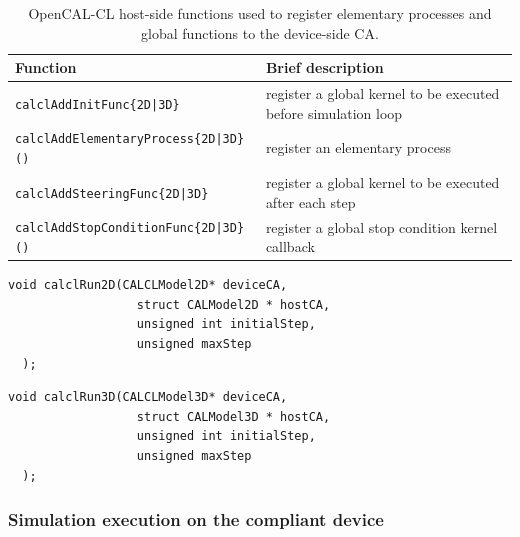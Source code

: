 \begin{table}
  \centering
  \begin{footnotesize}
  \begin{tabular}{l|l}
    \hline
    Function & Brief description\\
    \hline
    \verb'calclAddInitFunc{2D|3D}'             & register a global kernel to be executed before simulation loop \\
    \verb'calclAddElementaryProcess{2D|3D}()'  & register an elementary process \\
    \verb'calclAddSteeringFunc{2D|3D}'         & register a global kernel to be executed after each step \\
    \verb'calclAddStopConditionFunc{2D|3D}()'  & register a global stop condition kernel callback \\
    \hline
    \end{tabular}
    \end{footnotesize}
  \caption{OpenCAL-CL host-side functions used to register elementary processes and global functions to the device-side CA.}
  \label{tab:XXX}
\end{table}


\begin{lstlisting}[float,floatplacement=H, label=lst:calclRun2D, caption=The calclRun2D() function., numbers=none]
  void calclRun2D(CALCLModel2D* deviceCA,
                  struct CALModel2D * hostCA,
                  unsigned int initialStep,
                  unsigned maxStep
  );
\end{lstlisting}

\begin{lstlisting}[float,floatplacement=H, label=lst:calclRun3D, caption=The calclRun3D() function., numbers=none]
  void calclRun3D(CALCLModel3D* deviceCA,
                  struct CALModel3D * hostCA,
                  unsigned int initialStep,
                  unsigned maxStep
  );
\end{lstlisting}


\subsubsection{Simulation execution on the compliant device}

